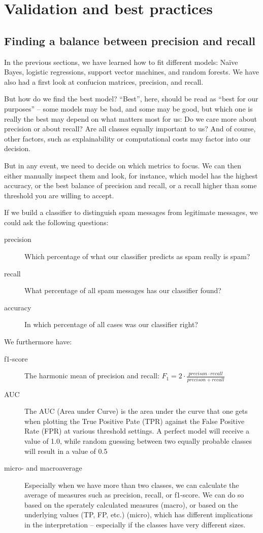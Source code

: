 \section{Validation and best practices}
\label{sec:validation}
\subsection{Finding a balance between precision and recall}
In the previous sections, we have learned how to fit different models:
Na\"ive Bayes, logistic regressions, support vector machines, and
random forests.  We have also had a first look at confucion matrices,
precision, and recall.

But how do we find the best model? ``Best'', here, should be read as
``best for our purposes'' -- some models may be bad, and some may be
good, but which one is really the best may depend on what matters most
for us: Do we care more about precision or about recall? Are all
classes equally important to us?  And of course, other factors, such
as explainability or computational costs may factor into our decision.
 
But in any event, we need to decide on which metrics to focus.  We can
then either manually inspect them and look, for instance, which model
has the highest accuracy, or the best balance of precision and recall,
or a recall higher than some threshold you are willing to accept.

If we build a classifier to distinguish spam messages from legitimate
messages, we could ask the following questions:
\begin{description}
\item[precision] Which percentage of what our classifier predicts as
  spam really is spam?
\item[recall]{What percentage of all spam messages has our classifier
  found?}
\item[accuracy]{In which percentage of all cases was our classifier
  right?}
\end{description}

We furthermore have:
\begin{description}
\item[f1-score]{The harmonic mean of precision and recall: $F_1 = 2
  \cdot \frac{precison \cdot recall}{precison + recall}$}
\item[AUC]{The AUC (Area under Curve) is the area under the curve that
  one gets when plotting the True Positive Pate (TPR) against the
  False Positive Rate (FPR) at various threshold settings. A perfect
  model will receive a value of 1.0, while random guessing between two
  equally probable classes will result in a value of 0.5}
\item[micro- and macroaverage]{Especially when we have more than two
  classes, we can calculate the average of measures such as precision,
  recall, or f1-score. We can do so based on the sperately calculated
  measures (macro), or based on the underlying values (TP, FP, etc.)
  (micro), which has different implications in the interpretation --
  especially if the classes have very different sizes.}
\end{description}


